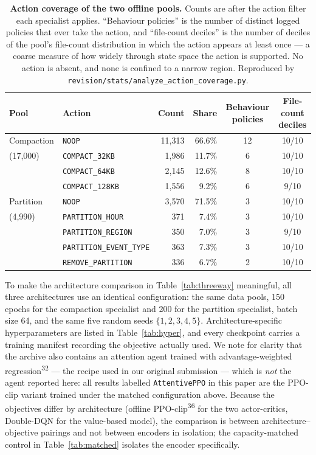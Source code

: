\documentclass[fleqn,10pt]{wlscirep}
\newcommand{\attentive}{\texttt{AttentivePPO}}
\newcommand{\noop}{\texttt{NOOP}}
\newcommand{\cthirtytwo}{\texttt{COMPACT\_32KB}}
\newcommand{\csixtyfour}{\texttt{COMPACT\_64KB}}
\newcommand{\conehundredtwentyeight}{\texttt{COMPACT\_128KB}}
\begin{document}
\begin{table}[!htbp]
\centering
\begin{tabular}{llrrcc}
\toprule
\textbf{Pool} & \textbf{Action} & \textbf{Count} & \textbf{Share} &
  \textbf{Behaviour policies} & \textbf{File-count deciles} \\
\midrule
Compaction & \noop{}                & 11{,}313 & 66.6\% & 12 & 10/10 \\
(17{,}000) & \cthirtytwo{}          &  1{,}986 & 11.7\% &  6 & 10/10 \\
           & \csixtyfour{}          &  2{,}145 & 12.6\% &  8 & 10/10 \\
           & \conehundredtwentyeight{} & 1{,}556 &  9.2\% &  6 & \phantom{0}9/10 \\
\midrule
Partition  & \noop{}                &  3{,}570 & 71.5\% &  3 & 10/10 \\
(4{,}990)  & \texttt{PARTITION\_HOUR}       & 371 & 7.4\% & 3 & 10/10 \\
           & \texttt{PARTITION\_REGION}     & 350 & 7.0\% & 3 & \phantom{0}9/10 \\
           & \texttt{PARTITION\_EVENT\_TYPE} & 363 & 7.3\% & 3 & 10/10 \\
           & \texttt{REMOVE\_PARTITION}     & 336 & 6.7\% & 2 & 10/10 \\
\bottomrule
\end{tabular}
\caption{\label{tab:coverage}\textbf{Action coverage of the two offline pools.}
  Counts are after the action filter each specialist applies. ``Behaviour
  policies'' is the number of distinct logged policies that ever take the
  action, and ``file-count deciles'' is the number of deciles of the
  pool's file-count distribution in which the action appears at least
  once --- a coarse measure of how widely through state space the action
  is supported. No action is absent, and none is confined to a narrow
  region. Reproduced by
  \texttt{revision/stats/analyze\_action\_coverage.py}.}
\end{table}

To make the architecture comparison in Table~\ref{tab:threeway}
meaningful, all three architectures use an identical configuration:
the same data pools, 150 epochs for the compaction specialist and 200
for the partition specialist, batch size 64, and the same five random
seeds $\{1,2,3,4,5\}$. Architecture-specific hyperparameters are listed
in Table~\ref{tab:hyper}, and every checkpoint carries a training
manifest recording the objective actually used. We note for clarity that
the archive also contains an attention agent trained with
advantage-weighted regression\textsuperscript{32} --- the recipe used in
our original submission --- which is \emph{not} the agent reported here:
all results labelled \attentive{} in this paper are the PPO-clip variant
trained under the matched configuration above. Because the objectives differ by architecture
(offline PPO-clip\textsuperscript{36} for the two actor-critics,
Double-DQN for the value-based model), the comparison is between
architecture--objective pairings and not between encoders in isolation; the capacity-matched
control in Table~\ref{tab:matched} isolates the encoder specifically.
\end{document}
